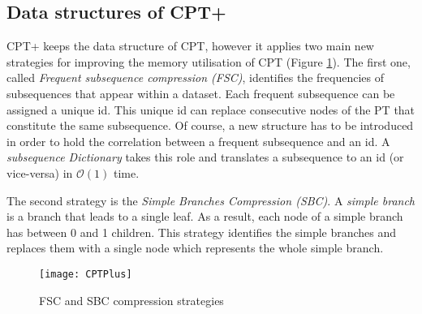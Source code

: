 \subsection{Data structures of CPT+}
CPT+ keeps the data structure of CPT, however it applies two main new strategies for improving the memory utilisation of CPT \cite{gueniche_fournier-viger_raman_tseng_2015} (Figure \ref{fig:CPTPlus}). The first one, called \emph{Frequent subsequence compression (FSC)}, identifies the frequencies of subsequences that appear within a dataset. Each frequent subsequence can be assigned a unique id. This unique id can replace consecutive nodes of the PT that constitute the same subsequence. Of course, a new structure has to be introduced in order to hold the correlation between a frequent subsequence and an id. A \emph{subsequence Dictionary} takes this role and translates a subsequence to an id (or vice-versa) in \(\mathcal{O}(1)\) time. 
\par The second strategy is the \emph{Simple Branches Compression (SBC)}. A \emph{simple branch} is a branch that leads to a single leaf. As a result, each node of a simple branch has between 0 and 1 children. This strategy identifies the simple branches and replaces them with a single node which represents the whole simple branch.

\begin{figure}[h]
    \centering
    \texttt{[image: CPTPlus]}
    \caption{FSC and SBC compression strategies}
    \label{fig:CPTPlus}
\end{figure}

